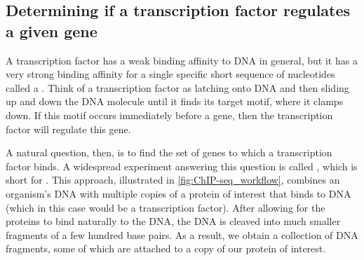 \subsection{Determining if a transcription factor regulates a given gene}

A transcription factor has a weak binding affinity to DNA in general, but it has a very strong binding affinity for a single specific short sequence of nucleotides called a . Think of a transcription factor as latching onto DNA and then sliding up and down the DNA molecule until it finds its target motif, where it clamps down. If this motif occurs immediately before a gene, then the transcription factor will regulate this gene.\\

\begin{note}\end{note}

A natural question, then, is to find the set of genes to which a transcription factor binds. A widespread experiment answering this question is called , which is short for . This approach, illustrated in \autoref{fig:ChIP-seq_workflow}, combines an organism's DNA with multiple copies of a protein of interest that binds to DNA (which in this case would be a transcription factor). After allowing for the proteins to bind naturally to the DNA, the DNA is cleaved into much smaller fragments of a few hundred base pairs. As a result, we obtain a collection of DNA fragments, some of which are attached to a copy of our protein of interest.

